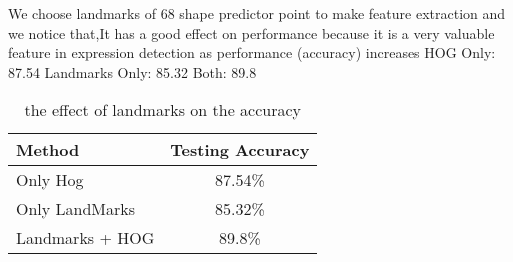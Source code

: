 We choose landmarks of 68 shape predictor point to make feature extraction and we notice that,It has a good effect on performance because it is a very valuable feature in expression detection as performance (accuracy) increases 
HOG Only: 87.54%
Landmarks Only: 85.32%
Both: 89.8%

\begin{table}[h!]
	\begin{center}
		\caption{the effect of landmarks on the accuracy}
		\begin{tabular}{l|c}
			\textbf{Method} & \textbf{Testing Accuracy}     \\
			\hline
			Only Hog & 87.54\% \\ 
			Only LandMarks & 85.32\%  \\
			Landmarks + HOG & 89.8\% \\
		\end{tabular}
	\end{center}
\end{table}


